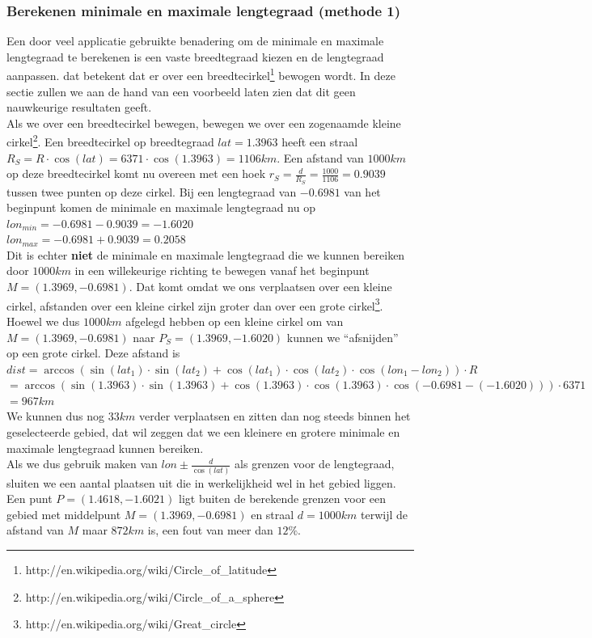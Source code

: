 \documentclass[twoside,openright]{uva-bachelor-thesis}
\begin{document}
		\subsubsection{Berekenen minimale en maximale lengtegraad (methode 1)}
		Een door veel applicatie gebruikte benadering om de minimale en maximale lengtegraad te berekenen is een vaste breedtegraad kiezen en de lengtegraad aanpassen. dat betekent dat er over een breedtecirkel\footnote{http://en.wikipedia.org/wiki/Circle\_of\_latitude} bewogen wordt. In deze sectie zullen we aan de hand van een voorbeeld laten zien dat dit geen nauwkeurige resultaten geeft.
		\\[0.5cm]
		Als we over een breedtecirkel bewegen, bewegen we over een zogenaamde kleine cirkel\footnote{http://en.wikipedia.org/wiki/Circle\_of\_a\_sphere}. Een breedtecirkel op breedtegraad $lat = 1.3963$ heeft een straal $R_{S} = R \cdot \cos(lat) = 6371 \cdot \cos(1.3963) = 1106km$. Een afstand van $1000km$ op deze breedtecirkel komt nu overeen met een hoek $r_{S} = \frac{d}{R_{S}} = \frac{1000}{1106} = 0.9039$ tussen twee punten op deze cirkel. Bij een lengtegraad van $-0.6981$ van het beginpunt komen de minimale en maximale lengtegraad nu op
		\\[0.5cm]
		$lon_{min} = -0.6981 - 0.9039 = -1.6020$\\
		$lon_{max} = -0.6981 + 0.9039 = 0.2058$\\[0.5cm]
		Dit is echter \textbf{niet} de minimale en maximale lengtegraad die we kunnen bereiken door $1000km$ in een willekeurige richting te bewegen vanaf het beginpunt $M = (1.3969, -0.6981)$. Dat komt omdat we ons verplaatsen over een kleine cirkel, afstanden over een kleine cirkel zijn groter dan over een grote cirkel\footnote{http://en.wikipedia.org/wiki/Great\_circle}. Hoewel we dus $1000km$ afgelegd hebben op een kleine cirkel om van $M = (1.3969, -0.6981)$ naar $P_{S} = (1.3969, -1.6020)$ kunnen we ``afsnijden'' op een grote cirkel. Deze afstand is\\[0.5cm]		
		$dist = \arccos(\sin(lat_1) \cdot \sin(lat_2) + \cos(lat_1) \cdot \cos(lat_2) \cdot \cos(lon_1 - lon_2)) \cdot R$\\
		$= \arccos(\sin(1.3963) \cdot \sin(1.3963) + \cos(1.3963) \cdot \cos(1.3963) \cdot \cos(-0.6981 - (-1.6020))) \cdot 6371$\\
		$= 967km$\\[0.5cm]
		We kunnen dus nog $33km$ verder verplaatsen en zitten dan nog steeds binnen het geselecteerde gebied, dat wil zeggen dat we een kleinere en grotere minimale en maximale lengtegraad kunnen bereiken.\\[0.5cm]
		Als we dus gebruik maken van $lon \pm \frac{d}{\cos(lat)}$ als grenzen voor de lengtegraad, sluiten we een aantal plaatsen uit die in werkelijkheid wel in het gebied liggen. Een punt $P = (1.4618, -1.6021)$ ligt buiten de berekende grenzen voor een gebied met middelpunt $M = (1.3969, -0.6981)$ en straal $d = 1000km$  terwijl de afstand van $M$ maar $872km$ is, een fout van meer dan $12\%$.
\end{document}
